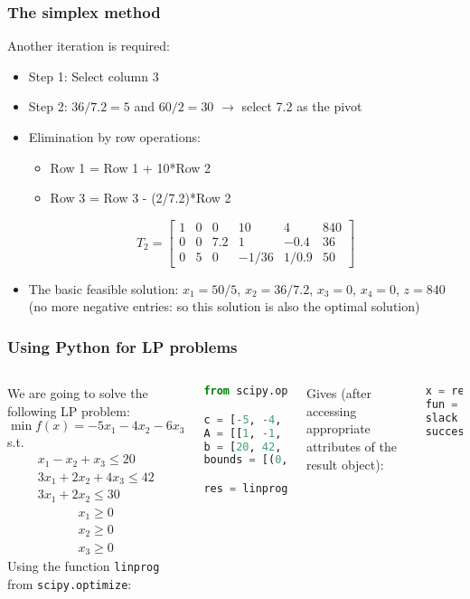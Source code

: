 \begin{frame}
  \frametitle{The simplex method}
  Another iteration is required:
  \begin{itemize}
    \item Step 1: Select column 3
    \item Step 2: $36/7.2 = 5$ and $60/2 = 30$ $\longrightarrow$ select 7.2 as the pivot
    \item Elimination by row operations:
    \begin{itemize}
      \item Row 1 = Row 1 + 10*Row 2
      \item Row 3 = Row 3 - (2/7.2)*Row 2
    \end{itemize}
       \[
T_2 = \begin{bmatrix}
1 & 0 & 0 & 10 & 4 & 840\\ 
0 & 0 & 7.2 & 1 & -0.4 & 36\\
0 & 5 & 0 & -1/36 & 1/0.9 &50 
\end{bmatrix}
   \]
    \item The basic feasible solution: $x_1 = 50/5$, $x_2 = 36/7.2$, $x_3 = 0$, $x_4 = 0$, $z=840$ (no more negative entries: so this solution is also the optimal solution)
  \end{itemize}
\end{frame}

\begin{frame}[fragile]
  \frametitle{Using Python for LP problems}
  \begin{columns}
    We are going to solve the following LP problem:\\
    \[
    \min f(x) = -5x_1 -4x_2 - 6x_3 
    \] 
    s.t. \\
    \[
    \begin{array}{l}
    x_1 - x_2 + x_3 \leq 20 \\
    3x_1 + 2x_2 + 4x_3 \leq 42 \\
    3x_1 + 2x_2 \leq 30 
    \end{array}
    \]
    \[
    \begin{array}{l}
    x_1 \geq 0 \\
    x_2 \geq 0 \\
    x_3 \geq 0
    \end{array}
    \]
    Using the function \texttt{linprog} from \texttt{scipy.optimize}:
    \begin{lstlisting}[language=Python, basicstyle=\scriptsize]
from scipy.optimize import linprog

c = [-5, -4, -6]
A = [[1, -1, 1], [3, 2, 4], [3, 2, 0]]
b = [20, 42, 30]
bounds = [(0, None), (0, None), (0, None)]

res = linprog(c, A_ub=A, b_ub=b, bounds=bounds)
    \end{lstlisting}
Gives (after accessing appropriate attributes of the result object):
    \begin{lstlisting}[language=Python, basicstyle=\scriptsize]
x = res.x
fun = res.fun
slack = res.slack
success = res.success
    \end{lstlisting}
  \end{columns}
\end{frame}


